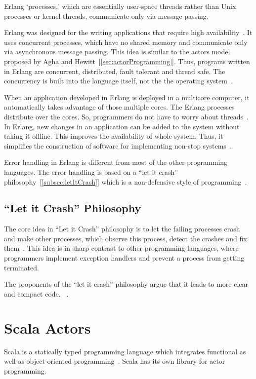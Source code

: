   Erlang ‘processes,’ which are essentially user-space threads rather than Unix processes or kernel threads, communicate only via message passing.

  Erlang was designed for the writing applications that require high availability~\cite{armstrong}. It uses concurrent processes, which have no shared memory and communicate only via asynchronous message passing. This idea is similar to the actors model proposed by Agha and Hewitt~[\autoref{sec:actorProgramming}]. Thus, programs written in Erlang are concurrent, distributed, fault tolerant and thread safe. The concurrency is built into the language itself, not the the operating system~\cite{Armstrong:2010:ERL:1810891.1810910}.

  When an application developed in Erlang is deployed in a multicore computer, it automatically takes advantage of those multiple cores. The Erlang processes distribute over the cores. So, programmers do not have to worry about threads~\cite{Armstrong:2010:ERL:1810891.1810910}. In Erlang, new changes in an application can be added to the system without taking it offline. This improves the availability of whole system. Thus, it simplifies the construction of software for implementing non-stop systems~\cite{armstrong}.

  Error handling in Erlang is different from most of the other programming languages. The error handling is based on a “let it crash” philosophy~[\autoref{subsec:letItCrash}] which is a non-defensive style of programming~\cite{armstrong, Armstrong:2010:ERL:1810891.1810910}.

\subsection{“Let it Crash” Philosophy}
\label{subsec:letItCrash}
  The core idea in “Let it Crash” philosophy is to let the failing processes crash and make other processes, which observe this process, detect the crashes and fix them~\cite{Armstrong:2010:ERL:1810891.1810910}. This idea is in sharp contrast to other programming languages, where programmers implement exception handlers and prevent a process from getting terminated.

  The proponents of the “let it crash” philosophy argue that it leads to more clear and compact code.
~\cite{Armstrong:2010:ERL:1810891.1810910}.

\section{Scala Actors}
\label{sec:scala}
Scala is a statically typed programming language which integrates functional as well as object-oriented programming~\cite{Odersky}. Scala has its own library for actor programming.

